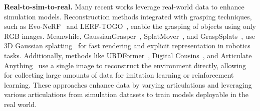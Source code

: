 \noindent\textbf{Real-to-sim-to-real.}
Many recent works leverage real-world data to enhance simulation models. Reconstruction methods integrated with grasping techniques, such as Evo-NeRF~\citep{kerr2023evo} and LERF-TOGO~\citep{lerftogo2023}, enable the grasping of objects using only RGB images. 
Meanwhile, GaussianGrasper~\citep{zheng2024gaussiangrasper}, SplatMover~\citep{shorinwa2024splat}, and GraspSplats~\citep{ji2024graspsplats}, use 3D Gaussian splatting~\citep{kerbl3Dgaussians} for fast rendering and explicit representation in robotics tasks. Additionally, methods like URDFormer~\citep{urdformer}, Digital Cousins~\citep{acdcdai2024}, and Articulate Anything~\citep{articulateanythingle2024} use a single image to reconstruct the environment directly, allowing for collecting large amounts of data for imitation learning or reinforcement learning. These approaches enhance data by varying articulations and leveraging various articulations from simulation datasets to train models deployable in the real world.



